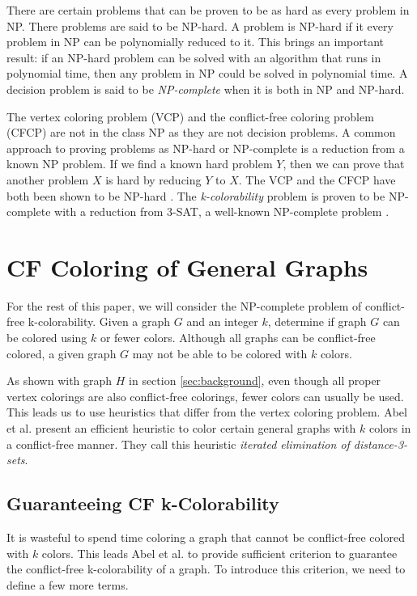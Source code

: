 \documentclass{sig-alternate}
\begin{document}
There are certain problems that can be proven to be as hard as every problem in NP. There problems are said to be NP-hard. A problem is NP-hard if it every problem in NP can be polynomially reduced to it. This brings an important result: if an NP-hard problem can be solved with an algorithm that runs in polynomial time, then any problem in NP could be solved in polynomial time. A decision problem is said to be \emph{NP-complete} when it is both in NP and NP-hard.

The vertex coloring problem (VCP) and the conflict-free coloring problem (CFCP) are not in the class NP as they are not decision problems. A common approach to proving problems as NP-hard or NP-complete is a reduction from a known NP problem. If we find a known hard problem $Y$, then we can prove that another problem $X$ is hard by reducing $Y$ to $X$. The VCP and the CFCP have both been shown to be NP-hard \cite{abel2017three,moret1998theory}. The \emph{k-colorability} problem is proven to be NP-complete with a reduction from 3-SAT, a well-known NP-complete problem \cite{sharma2012new}.

\section{CF Coloring of General Graphs}
For the rest of this paper, we will consider the NP-complete problem of conflict-free k-colorability. Given a graph $G$ and an integer $k$, determine if graph $G$ can be colored using $k$ or fewer colors. Although all graphs can be conflict-free colored, a given graph $G$ may not be able to be colored with $k$ colors.

As shown with graph $H$ in section \ref{sec:background}, even though all proper vertex colorings are also conflict-free colorings, fewer colors can usually be used. This leads us to use heuristics that differ from the vertex coloring problem. Abel et al. \cite{abel2017three} present an efficient heuristic to color certain general graphs with $k$ colors in a conflict-free manner. They call this heuristic \emph{iterated elimination of distance-3-sets}.

\subsection{Guaranteeing CF k-Colorability}
It is wasteful to spend time coloring a graph that cannot be conflict-free colored with $k$ colors. This leads Abel et al. \cite{abel2017three} to provide sufficient criterion to guarantee the conflict-free k-colorability of a graph. To introduce this criterion, we need to define a few more terms.
\end{document}
